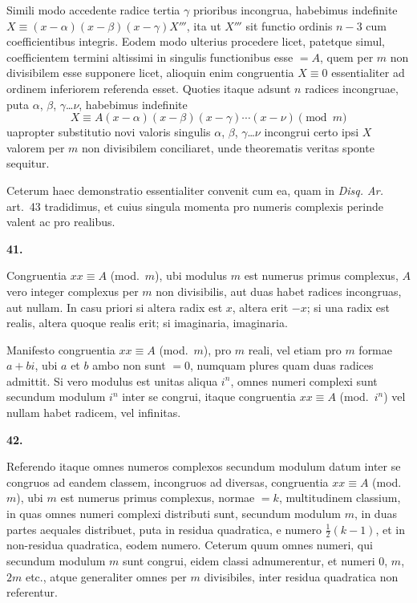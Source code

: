 \documentclass[12pt,a4paper]{article}
\newcommand{\art}[1]{\begin{center}\textbf{#1.}\end{center}}
\begin{document}
Simili modo accedente radice tertia $\gamma$ prioribus incongrua, habebimus indefinite $X\equiv (x-\alpha)(x-\beta)(x-\gamma)X'''$, ita ut $X'''$ sit functio ordinis $n-3$ cum coefficientibus integris. Eodem modo ulterius procedere licet, patetque simul, coefficientem termini altissimi in singulis functionibus esse $=A$, quem per $m$ non divisibilem esse supponere licet, alioquin enim congruentia $X\equiv 0$ essentialiter ad ordinem inferiorem referenda esset. Quoties itaque adsunt $n$ radices incongruae, puta $\alpha$, $\beta$, $\gamma$\ldots$\nu$, habebimus indefinite
\[X\equiv A(x-\alpha)(x-\beta)(x-\gamma)\cdots(x-\nu)\pmod{m}\]
uapropter substitutio novi valoris singulis $\alpha$, $\beta$, $\gamma$\ldots$\nu$ incongrui certo ipsi $X$ valorem per $m$ non divisibilem conciliaret, unde theorematis veritas sponte sequitur.

Ceterum haec demonstratio essentialiter convenit cum ea, quam in \textit{Disq. Ar.} art.~43 tradidimus, et cuius singula momenta pro numeris complexis perinde valent ac pro realibus.


\newpage

\art{41}

Congruentia $xx\equiv A$ (mod.~$m$), ubi modulus $m$ est numerus primus complexus, $A$ vero integer complexus per $m$ non divisibilis, aut duas habet radices incongruas, aut nullam. In casu priori si altera radix est $x$, altera erit $-x$; si una radix est realis, altera quoque realis erit; si imaginaria, imaginaria.

Manifesto congruentia $xx\equiv A$ (mod.~$m$), pro $m$ reali, vel etiam pro $m$ formae $a+bi$, ubi $a$ et $b$ ambo non sunt $=0$, numquam plures quam duas radices admittit. Si vero modulus est unitas aliqua $i^n$, omnes numeri complexi sunt secundum modulum $i^n$ inter se congrui, itaque congruentia $xx\equiv A$ (mod.~$i^n$) vel nullam habet radicem, vel infinitas.

\art{42}

Referendo itaque omnes numeros complexos secundum modulum datum inter se congruos ad eandem classem, incongruos ad diversas, congruentia $xx\equiv A$ (mod.~$m$), ubi $m$ est numerus primus complexus, normae $=k$, multitudinem classium, in quas omnes numeri complexi distributi sunt, secundum modulum $m$, in duas partes aequales distribuet, puta in residua quadratica, e numero $\frac{1}{2}(k-1)$, et in non-residua quadratica, eodem numero. Ceterum quum omnes numeri, qui secundum modulum $m$ sunt congrui, eidem classi adnumerentur, et numeri $0$, $m$, $2m$ etc., atque generaliter omnes per $m$ divisibiles, inter residua quadratica non referentur.
\end{document}
